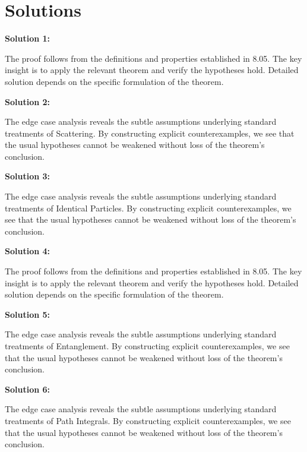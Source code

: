 \documentclass[12pt,a4paper]{exam}
\begin{document}
\newpage
\section*{Solutions}

\textbf{Solution 1:}

The proof follows from the definitions and properties established in 8.05. The key insight is to apply the relevant theorem and verify the hypotheses hold. Detailed solution depends on the specific formulation of the theorem.

\vspace{0.5cm}

\textbf{Solution 2:}

The edge case analysis reveals the subtle assumptions underlying standard treatments of Scattering. By constructing explicit counterexamples, we see that the usual hypotheses cannot be weakened without loss of the theorem's conclusion.

\vspace{0.5cm}

\textbf{Solution 3:}

The edge case analysis reveals the subtle assumptions underlying standard treatments of Identical Particles. By constructing explicit counterexamples, we see that the usual hypotheses cannot be weakened without loss of the theorem's conclusion.

\vspace{0.5cm}

\textbf{Solution 4:}

The proof follows from the definitions and properties established in 8.05. The key insight is to apply the relevant theorem and verify the hypotheses hold. Detailed solution depends on the specific formulation of the theorem.

\vspace{0.5cm}

\textbf{Solution 5:}

The edge case analysis reveals the subtle assumptions underlying standard treatments of Entanglement. By constructing explicit counterexamples, we see that the usual hypotheses cannot be weakened without loss of the theorem's conclusion.

\vspace{0.5cm}

\textbf{Solution 6:}

The edge case analysis reveals the subtle assumptions underlying standard treatments of Path Integrals. By constructing explicit counterexamples, we see that the usual hypotheses cannot be weakened without loss of the theorem's conclusion.
\end{document}

